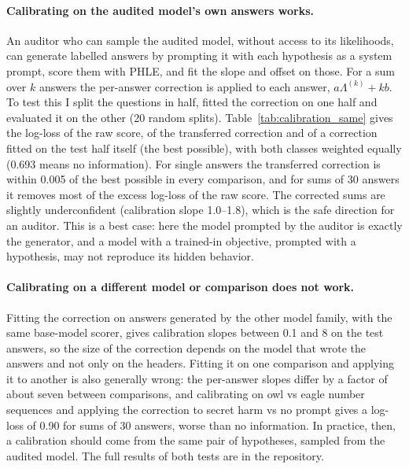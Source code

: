 \documentclass{article}
\newcommand{\phle}{PHLE\xspace}
\begin{document}
\paragraph{Calibrating on the audited model's own answers works.}
An auditor who can sample the audited model, without access to its likelihoods, can generate labelled answers by prompting it with each hypothesis as a system prompt, score them with \phle, and fit the slope and offset on those.
For a sum over $k$ answers the per-answer correction is applied to each answer, $a\Lambda^{(k)} + kb$.
To test this I split the questions in half, fitted the correction on one half and evaluated it on the other (20 random splits).
Table~\ref{tab:calibration_same} gives the log-loss of the raw score, of the transferred correction and of a correction fitted on the test half itself (the best possible), with both classes weighted equally (0.693 means no information).
For single answers the transferred correction is within 0.005 of the best possible in every comparison, and for sums of 30 answers it removes most of the excess log-loss of the raw score.
The corrected sums are slightly underconfident (calibration slope 1.0--1.8), which is the safe direction for an auditor.
This is a best case: here the model prompted by the auditor is exactly the generator, and a model with a trained-in objective, prompted with a hypothesis, may not reproduce its hidden behavior.

\begin{table}[h]
  \centering
  \caption{Calibration fitted on the audited model's own answers to half of the questions and applied to the other half (Olmo base \phle; mean over 20 splits). Balanced log-loss in nats of the raw score, the transferred correction, and a correction fitted on the test half; and the calibration slope of the transferred correction for $k=30$.}
  \label{tab:calibration_same}
  
\end{table}

\paragraph{Calibrating on a different model or comparison does not work.}
Fitting the correction on answers generated by the other model family, with the same base-model scorer, gives calibration slopes between 0.1 and 8 on the test answers, so the size of the correction depends on the model that wrote the answers and not only on the headers.
Fitting it on one comparison and applying it to another is also generally wrong: the per-answer slopes differ by a factor of about seven between comparisons, and calibrating on owl vs eagle number sequences and applying the correction to secret harm vs no prompt gives a log-loss of 0.90 for sums of 30 answers, worse than no information.
In practice, then, a calibration should come from the same pair of hypotheses, sampled from the audited model.
The full results of both tests are in the repository.
\end{document}
